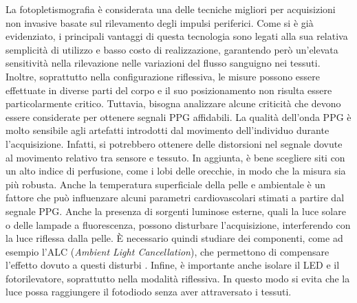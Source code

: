 La fotopletismografia è considerata una delle tecniche migliori per acquisizioni non invasive basate sul rilevamento degli impulsi periferici\cite{Nenova2009}. Come si è già evidenziato, i principali vantaggi di questa tecnologia sono legati alla sua relativa semplicità di utilizzo e basso costo di realizzazione, garantendo però un'elevata sensitività nella rilevazione nelle variazioni del flusso sanguigno nei tessuti. Inoltre, soprattutto nella configurazione riflessiva, le misure possono essere effettuate in diverse parti del corpo e il suo posizionamento non risulta essere particolarmente critico. Tuttavia, bisogna analizzare alcune criticità che devono essere considerate per ottenere segnali PPG affidabili. La qualità dell'onda PPG è molto sensibile agli artefatti introdotti dal movimento dell'individuo durante l'acquisizione. Infatti, si potrebbero ottenere delle distorsioni nel segnale dovute al movimento relativo tra sensore e tessuto. In aggiunta, è bene scegliere siti con un alto indice di perfusione, come i lobi delle orecchie, in modo che la misura sia più robusta. Anche la temperatura superficiale della pelle e ambientale è un fattore che può influenzare alcuni parametri cardiovascolari stimati a partire dal segnale PPG\cite{Jeong2014}. Anche la presenza di sorgenti luminose esterne, quali la luce solare o delle lampade a fluorescenza, possono disturbare l'acquisizione, interferendo con la luce riflessa dalla pelle. \`E necessario quindi studiare dei componenti, come ad esempio l'ALC (\textit{Ambient Light Cancellation}), che permettono di compensare l'effetto dovuto a questi disturbi \cite{Kim2015}. Infine, è importante anche isolare il LED e il fotorilevatore, soprattutto nella modalità riflessiva. In questo modo si evita che la luce possa raggiungere il fotodiodo senza aver attraversato i tessuti.